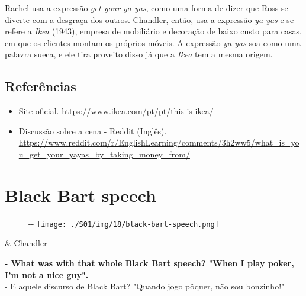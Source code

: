 Rachel usa a expressão \emph{get your ya-yas}, como uma forma de dizer
que Ross se diverte com a desgraça dos outros. Chandler, então, usa a
expressão \emph{ya-yas} e se refere a \emph{Ikea} (1943), empresa de
mobiliário e decoração de baixo custo para casas, em que os clientes
montam os próprios móveis. A expressão \emph{ya-yas} soa como uma
palavra sueca, e ele tira proveito disso já que a \emph{Ikea} tem a
mesma origem.

\hypertarget{referuxeancias-5}{%
\subsection{Referências}\label{referuxeancias-5}}

\begin{itemize}
\tightlist
\item
  \sloppy Site oficial. \url{https://www.ikea.com/pt/pt/this-is-ikea/}
\item
  \sloppy Discussão sobre a cena - Reddit (Inglês). \url{https://www.reddit.com/r/EnglishLearning/comments/3h2ww5/what_is_you_get_your_yayas_by_taking_money_from/}
\end{itemize}

\hypertarget{black-bart-speech}{%
\section{Black Bart speech}\label{black-bart-speech}}

\begin{figure}[!ht]
  \begin{adjustwidth}{-\oddsidemargin-1in}{-\rightmargin}
    \centering
    \texttt{[image: ./S01/img/18/black-bart-speech.png]}
  \end{adjustwidth}
\end{figure}

\begin{tcolorbox}[enhanced,center upper,
    drop fuzzy shadow southeast, boxrule=0.3pt,
    lower separated=false, breakable,
    colframe=black!30!dialogoBorder,colback=white]
\begin{minipage}[c]{0.16\linewidth}
   & \centering \scriptsize{Chandler}
\end{minipage}
\hfill
\begin{minipage}[c]{0.8\linewidth}
  \textbf{- What was with that whole Black Bart speech? "When I play poker, I'm not a nice guy".}\\
  - E aquele discurso de Black Bart? "Quando jogo pôquer, não sou bonzinho!"
\end{minipage}
\end{tcolorbox}

